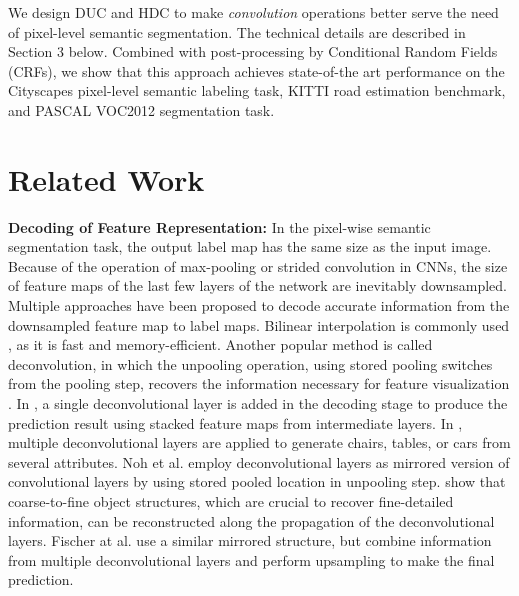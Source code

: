 \documentclass[10pt,twocolumn,letterpaper]{article}
\begin{document}
We design DUC and HDC to make \textit{convolution} operations better serve the need of pixel-level semantic segmentation. The technical details are described in Section 3 below. Combined with post-processing by Conditional Random Fields (CRFs), we show that this approach achieves state-of-the art performance on the Cityscapes pixel-level semantic labeling task, KITTI road estimation benchmark, and PASCAL VOC2012 segmentation task.

\section{Related Work}
\textbf{Decoding of Feature Representation:} In the pixel-wise semantic segmentation task, the output label map has the same size as the input image. Because of the operation of max-pooling or strided convolution in CNNs, the size of feature maps of the last few layers of the network are inevitably downsampled. Multiple approaches have been proposed to decode accurate information from the downsampled feature map to label maps. Bilinear interpolation is commonly used \cite{lin2015efficient,liu2015semantic,chen2016deeplab}, as it is fast and memory-efficient. Another popular method is called deconvolution, in which the unpooling operation, using stored pooling switches from the pooling step, recovers the information necessary for feature visualization \cite{zeiler2014visualizing}. In \cite{long2015fully}, a single deconvolutional layer is added in the decoding stage to produce the prediction result using stacked feature maps from intermediate layers. In \cite{dosovitskiy2015learning}, multiple deconvolutional layers are applied to generate chairs, tables, or cars from several attributes. Noh et al. \cite{noh2015learning} employ deconvolutional layers as mirrored version of convolutional layers by using stored pooled location in unpooling step. \cite{noh2015learning} show that coarse-to-fine object structures, which are crucial to recover fine-detailed information, can be reconstructed along the propagation of the deconvolutional layers. Fischer at al. \cite{fischer2015flownet} use a similar mirrored structure, but combine information from multiple deconvolutional layers and perform upsampling to make the final prediction.
\end{document}
